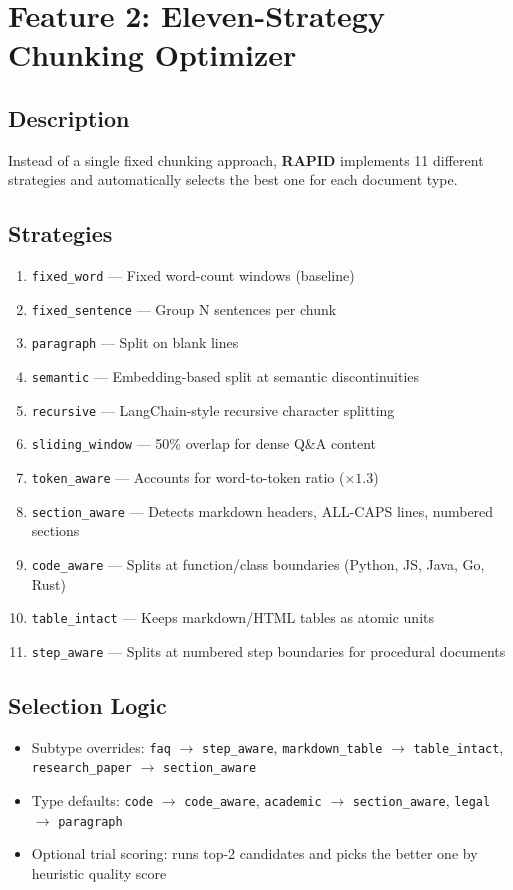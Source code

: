 \documentclass[12pt, a4paper, oneside]{report}
\newcommand{\kw}[1]{\texttt{\small #1}}
\newcommand{\rapidsys}{\textbf{\color{rapidblue}RAPID}}
\begin{document}
\section{Feature 2: Eleven-Strategy Chunking Optimizer}

\subsection*{Description}
Instead of a single fixed chunking approach, \rapidsys{} implements 11 different strategies
and automatically selects the best one for each document type.

\subsection*{Strategies}

\begin{enumerate}
  \item \kw{fixed\_word} — Fixed word-count windows (baseline)
  \item \kw{fixed\_sentence} — Group N sentences per chunk
  \item \kw{paragraph} — Split on blank lines
  \item \kw{semantic} — Embedding-based split at semantic discontinuities
  \item \kw{recursive} — LangChain-style recursive character splitting
  \item \kw{sliding\_window} — 50\% overlap for dense Q\&A content
  \item \kw{token\_aware} — Accounts for word-to-token ratio ($\times 1.3$)
  \item \kw{section\_aware} — Detects markdown headers, ALL-CAPS lines, numbered sections
  \item \kw{code\_aware} — Splits at function/class boundaries (Python, JS, Java, Go, Rust)
  \item \kw{table\_intact} — Keeps markdown/HTML tables as atomic units
  \item \kw{step\_aware} — Splits at numbered step boundaries for procedural documents
\end{enumerate}

\subsection*{Selection Logic}
\begin{itemize}
  \item Subtype overrides: \kw{faq} \(\to\) \kw{step\_aware}, \kw{markdown\_table} \(\to\) \kw{table\_intact}, \kw{research\_paper} \(\to\) \kw{section\_aware}
  \item Type defaults: \kw{code} \(\to\) \kw{code\_aware}, \kw{academic} \(\to\) \kw{section\_aware}, \kw{legal} \(\to\) \kw{paragraph}
  \item Optional trial scoring: runs top-2 candidates and picks the better one by heuristic quality score
\end{itemize}
\end{document}
